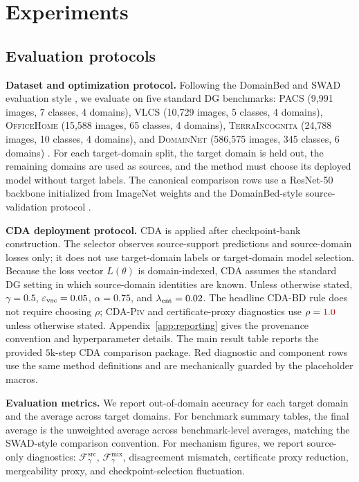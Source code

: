 \documentclass{article}
\newif\ifsubmissionmode
\newcommand{\placeholderguard}[1]{%
  \ifsubmissionmode
    \PackageError{cda_final_v2}{Provisional red content remains in submission mode}{Remove all provisional red content before building in submission mode.}%
  \else
    {\color{red!70!black}#1}%
  \fi
}
\newcommand{\provnum}[1]{\placeholderguard{#1}}
\newcommand{\data}[1]{\textsc{#1}}
\theoremstyle{definition}
\newcommand{\piv}{\textup{\textsc{CDA-Piv}}}
\newcommand{\bd}{\textup{\textsc{CDA-BD}}}
\newcommand{\sourceflat}{\mathcal{F}^{\mathrm{src}}_\gamma}
\newcommand{\mixflat}{\mathcal{F}^{\mathrm{mix}}_\gamma}
\begin{document}
\section{Experiments}
\label{sec:experiments}

\subsection{Evaluation protocols}

\textbf{Dataset and optimization protocol.}
Following the DomainBed and SWAD evaluation style \citep{gulrajani2021domainbed,cha2021swad}, we evaluate on five standard DG benchmarks: \data{PACS} (9,991 images, 7 classes, 4 domains), \data{VLCS} (10,729 images, 5 classes, 4 domains), \data{OfficeHome} (15,588 images, 65 classes, 4 domains), \data{TerraIncognita} (24,788 images, 10 classes, 4 domains), and \data{DomainNet} (586,575 images, 345 classes, 6 domains) \citep{li2017pacs,fang2013vlcs,venkateswara2017officehome,beery2018terraincognita,peng2019domainnet}. For each target-domain split, the target domain is held out, the remaining domains are used as sources, and the method must choose its deployed model without target labels. The canonical comparison rows use a ResNet-50 backbone initialized from ImageNet weights and the DomainBed-style source-validation protocol \citep{he2016_cvpr_resnet,gulrajani2021domainbed}.

\textbf{CDA deployment protocol.}
CDA is applied after checkpoint-bank construction. The selector observes source-support predictions and source-domain losses only; it does not use target-domain labels or target-domain model selection. Because the loss vector \(L(\theta)\) is domain-indexed, CDA assumes the standard DG setting in which source-domain identities are known. Unless otherwise stated, \(\gamma=0.5\), \(\varepsilon_{\rm vsc}=0.05\), \(\alpha=0.75\), and \(\lambda_{\rm ent}=0.02\). The headline \bd{} rule does not require choosing \(\rho\); \piv{} and certificate-proxy diagnostics use \(\rho=\provnum{1.0}\) unless otherwise stated. Appendix~\ref{app:reporting} gives the provenance convention and hyperparameter details. The main result table reports the provided \(5\mathrm{k}\)-step CDA comparison package. Red diagnostic and component rows use the same method definitions and are mechanically guarded by the placeholder macros.

\textbf{Evaluation metrics.}
We report out-of-domain accuracy for each target domain and the average across target domains. For benchmark summary tables, the final average is the unweighted average across benchmark-level averages, matching the SWAD-style comparison convention. For mechanism figures, we report source-only diagnostics: \(\sourceflat\), \(\mixflat\), disagreement mismatch, certificate proxy reduction, mergeability proxy, and checkpoint-selection fluctuation.
\end{document}
